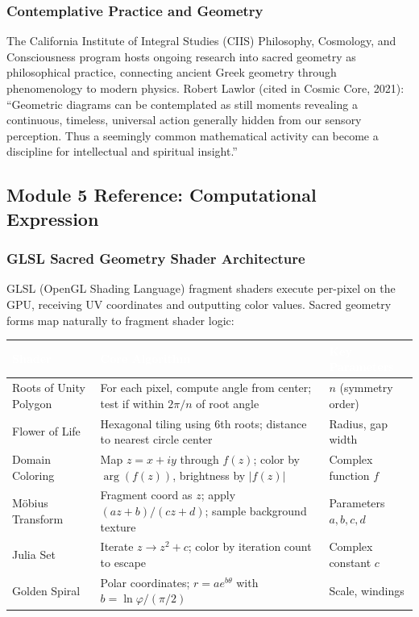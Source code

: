 \documentclass[11pt,letterpaper]{article}
\newcommand{\tableheader}[1]{\textbf{\sffamily\textcolor{white}{#1}}}
\begin{document}
\subsubsection{Contemplative Practice and Geometry}

The California Institute of Integral Studies (CIIS) Philosophy, Cosmology, and Consciousness program hosts ongoing research into sacred geometry as philosophical practice, connecting ancient Greek geometry through phenomenology to modern physics. Robert Lawlor (cited in Cosmic Core, 2021): ``Geometric diagrams can be contemplated as still moments revealing a continuous, timeless, universal action generally hidden from our sensory perception. Thus a seemingly common mathematical activity can become a discipline for intellectual and spiritual insight.''

\subsection{Module 5 Reference: Computational Expression}

\subsubsection{GLSL Sacred Geometry Shader Architecture}

GLSL (OpenGL Shading Language) fragment shaders execute per-pixel on the GPU, receiving UV coordinates and outputting color values. Sacred geometry forms map naturally to fragment shader logic:

\begin{center}
\begin{tabularx}{\textwidth}{L{3.5cm}XL{3cm}}
\toprule
{}
\tableheader{Shader} & \tableheader{Core Algorithm} & \tableheader{Key Parameters} \\
\midrule
Roots of Unity Polygon & For each pixel, compute angle from center; test if within $2\pi/n$ of root angle & $n$ (symmetry order) \\
Flower of Life & Hexagonal tiling using 6th roots; distance to nearest circle center & Radius, gap width \\
Domain Coloring & Map $z = x + iy$ through $f(z)$; color by $\arg(f(z))$, brightness by $|f(z)|$ & Complex function $f$ \\
M\"{o}bius Transform & Fragment coord as $z$; apply $(az+b)/(cz+d)$; sample background texture & Parameters $a,b,c,d$ \\
Julia Set & Iterate $z \to z^2 + c$; color by iteration count to escape & Complex constant $c$ \\
Golden Spiral & Polar coordinates; $r = ae^{b\theta}$ with $b = \ln\varphi/(\pi/2)$ & Scale, windings \\
\bottomrule
\end{tabularx}
\end{center}
\end{document}
